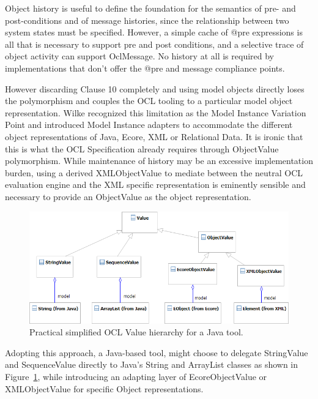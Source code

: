 \documentclass{eceasst}
\begin{document}
Object history is useful to define the foundation for the semantics of pre- and post-conditions and of message histories, since the relationship between two system states must be specified. However, a simple cache of @pre expressions is all that is necessary to support pre and post conditions, and a selective trace of object activity can support OclMessage. No history at all is required by implementations that don't offer the @pre and message compliance points.

However discarding Clause 10 completely and using model objects directly loses the polymorphism and couples the OCL tooling to a particular model object representation. Wilke\cite{Variability} recognized this limitation as the Model Instance Variation Point and introduced Model Instance adapters to accommodate the different object representations of Java, Ecore, XML or Relational Data. It is ironic that this is what the OCL Specification already requires through ObjectValue polymorphism. While maintenance of history may be an excessive implementation burden, using a derived XMLObjectValue to mediate between the neutral OCL evaluation engine and the XML specific representation is eminently sensible and necessary to provide an ObjectValue as the object representation.

\begin{figure}
  \begin{center}
    \includegraphics[width=5.75in]{Value.png}
  \end{center}
  \caption{Practical simplified OCL Value hierarchy for a Java tool.}
  \label{fig:Value}
\end{figure}

Adopting this approach, a Java-based tool, might choose to delegate StringValue and SequenceValue directly to Java's String and ArrayList classes as shown in Figure~\ref{fig:Value}, while introducing an adapting layer of EcoreObjectValue or XMLObjectValue for specific Object representations.
\end{document}
